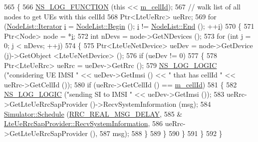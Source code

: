 \begin{DoxyCode}
565 \{
566     \hyperlink{log-macros-disabled_8h_a90b90d5bad1f39cb1b64923ea94c0761}{NS\_LOG\_FUNCTION} (\textcolor{keyword}{this} << \hyperlink{classns3_1_1LteEnbRrcProtocolReal_aa56625a227ef335a07121a995fce3ceb}{m\_cellId});
567   \textcolor{comment}{// walk list of all nodes to get UEs with this cellId}
568   Ptr<LteUeRrc> ueRrc;
569   \textcolor{keywordflow}{for} (\hyperlink{classns3_1_1NodeList_a9e2679a94efb4f0066cc21e65440364d}{NodeList::Iterator} \hyperlink{bernuolliDistribution_8m_a6f6ccfcf58b31cb6412107d9d5281426}{i} = \hyperlink{classns3_1_1NodeList_a93d2211831f5cb71d1dbb721e2721d7f}{NodeList::Begin} (); 
      \hyperlink{bernuolliDistribution_8m_a6f6ccfcf58b31cb6412107d9d5281426}{i} != \hyperlink{classns3_1_1NodeList_a027a558c16e6078e25c7ffc67becb559}{NodeList::End} (); ++\hyperlink{bernuolliDistribution_8m_a6f6ccfcf58b31cb6412107d9d5281426}{i})
570     \{
571       Ptr<Node> node = *\hyperlink{bernuolliDistribution_8m_a6f6ccfcf58b31cb6412107d9d5281426}{i};
572       \textcolor{keywordtype}{int} nDevs = node->GetNDevices ();
573       \textcolor{keywordflow}{for} (\textcolor{keywordtype}{int} j = 0; j < nDevs; ++j)
574         \{
575           Ptr<LteUeNetDevice> ueDev = node->GetDevice (j)->GetObject <LteUeNetDevice> ();
576           \textcolor{keywordflow}{if} (ueDev != 0)
577             \{
578               Ptr<LteUeRrc> ueRrc = ueDev->GetRrc ();
579               \hyperlink{group__logging_ga88acd260151caf2db9c0fc84997f45ce}{NS\_LOG\_LOGIC} (\textcolor{stringliteral}{"considering UE IMSI "} << ueDev->GetImsi () << \textcolor{stringliteral}{" that has cellId "} 
      << ueRrc->GetCellId ());
580               \textcolor{keywordflow}{if} (ueRrc->GetCellId () == \hyperlink{classns3_1_1LteEnbRrcProtocolReal_aa56625a227ef335a07121a995fce3ceb}{m\_cellId})
581                 \{
582                   \hyperlink{group__logging_ga88acd260151caf2db9c0fc84997f45ce}{NS\_LOG\_LOGIC} (\textcolor{stringliteral}{"sending SI to IMSI "} << ueDev->GetImsi ());
583                   ueRrc->GetLteUeRrcSapProvider ()->RecvSystemInformation (msg);
584                   \hyperlink{classns3_1_1Simulator_a671882c894a08af4a5e91181bf1eec13}{Simulator::Schedule} (\hyperlink{namespacens3_a8e3f859197e39602ba3ea59033f00404}{RRC\_REAL\_MSG\_DELAY}, 
585                                        &
      \hyperlink{classns3_1_1LteUeRrcSapProvider_a34d16c5adabf7ee0caf111fd2b6bfbd3}{LteUeRrcSapProvider::RecvSystemInformation},
586                                        ueRrc->GetLteUeRrcSapProvider (), 
587                                        msg);
588                 \}
589             \}
590         \}
591     \}
592 \}
\end{DoxyCode}


